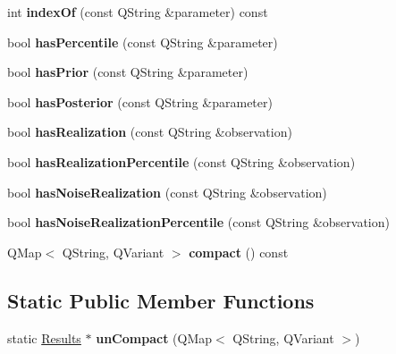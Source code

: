 \begin{DoxyCompactItemize}
int {\bfseries index\+Of} (const Q\+String \&parameter) const
\item 
\mbox{\label{class_results_a066478e20fc9ebd7b0074cae33012611}} 
bool {\bfseries has\+Percentile} (const Q\+String \&parameter)
\item 
\mbox{\label{class_results_a03110a4194e551098e1b0650d21eed29}} 
bool {\bfseries has\+Prior} (const Q\+String \&parameter)
\item 
\mbox{\label{class_results_a9f39695d06f6a27ead91828e7c6367a9}} 
bool {\bfseries has\+Posterior} (const Q\+String \&parameter)
\item 
\mbox{\label{class_results_ac13151610a3a45cd9be210f83f0bbdfe}} 
bool {\bfseries has\+Realization} (const Q\+String \&observation)
\item 
\mbox{\label{class_results_a9ecd8fede2dec1bf9b0aed8c148f70a6}} 
bool {\bfseries has\+Realization\+Percentile} (const Q\+String \&observation)
\item 
\mbox{\label{class_results_a48d3117a3340c25021d5bb59148cd002}} 
bool {\bfseries has\+Noise\+Realization} (const Q\+String \&observation)
\item 
\mbox{\label{class_results_a497d6f7f70f2db22082502e3c3613d02}} 
bool {\bfseries has\+Noise\+Realization\+Percentile} (const Q\+String \&observation)
\item 
\mbox{\label{class_results_a00a842608b8ed1b605eea02e22db3e13}} 
Q\+Map$<$ Q\+String, Q\+Variant $>$ {\bfseries compact} () const
\end{DoxyCompactItemize}
\subsection*{Static Public Member Functions}
\begin{DoxyCompactItemize}
\item 
\mbox{\label{class_results_a800270a327c34fbfc957313d7d1a1a70}} 
static \hyperlink{class_results}{Results} $\ast$ {\bfseries un\+Compact} (Q\+Map$<$ Q\+String, Q\+Variant $>$)
\end{DoxyCompactItemize}
